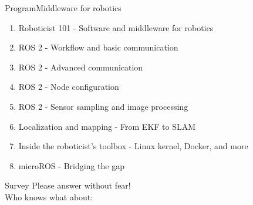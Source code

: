 \begin{frame}{Program}{Middleware for robotics}
	\begin{enumerate}
		\item Roboticist 101 - Software and middleware for robotics
		\item ROS 2 - Workflow and basic communication
		\item ROS 2 - Advanced communication
		\item ROS 2 - Node configuration
		\item ROS 2 - Sensor sampling and image processing
		\item Localization and mapping - From EKF to SLAM
		\item Inside the roboticist's toolbox - Linux kernel, Docker, and more
		\item microROS - Bridging the gap
	\end{enumerate}
\end{frame}

\begin{frame}{Survey}
  Please answer without fear!\\
  \bigskip
  Who knows what about:
  \begin{itemize}
  \end{itemize}
\end{frame}

